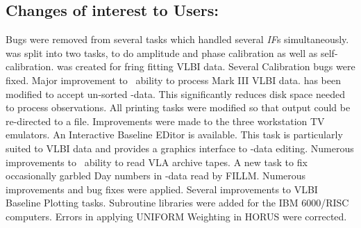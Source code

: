 \subsection{Changes of interest to Users:}
\begin{description}
 Bugs were removed from several tasks which handled
several {\it IF}s simultaneously.
\myitem{\CALIB} \CALIB was split into two tasks,
\CALIB to do amplitude and phase calibration as well as
self-calibration.
\FRING was created for fring fitting VLBI data.
Several Calibration bugs were fixed.
\myitem{\MKTIN} Major improvement to \AIPS\ ability to process
Mark III VLBI data.
\myitem{\MX} \MX has been modified to accept un-sorted \UV-data.
This significantly reduces disk space needed to process observations.
 All printing tasks were modified so that output
could be re-directed to a file.
 Improvements were made to the three workstation TV emulators.
\myitem{\IBLED} An Interactive Baseline EDitor is available.
This task is particularly suited to VLBI data and
provides a graphics interface to \UV-data editing.
\myitem{\FILLM} Numerous improvements to \AIPS\ ability to read
VLA archive tapes.
\myitem{\DAYFX} A new task to fix occasionally garbled Day numbers
in \UV-data read by FILLM.
\myitem{\CVEL} Numerous improvements and bug fixes were applied.
\myitem{\VBPLT} Several improvements to VLBI Baseline Plotting tasks.
 Subroutine libraries were added for the IBM 6000/RISC
computers.
 Errors in applying UNIFORM Weighting in HORUS were
corrected.
\end{description}
\normalstyle



